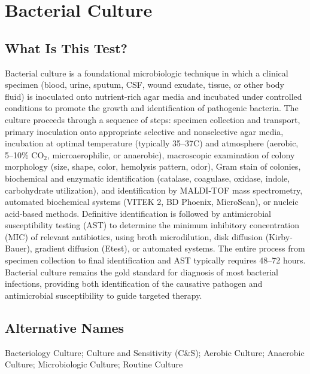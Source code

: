 \chapter{Bacterial Culture}

\section*{What Is This Test?}
Bacterial culture is a foundational microbiologic technique in which a clinical specimen (blood, urine, sputum, CSF, wound exudate, tissue, or other body fluid) is inoculated onto nutrient-rich agar media and incubated under controlled conditions to promote the growth and identification of pathogenic bacteria. The culture proceeds through a sequence of steps: specimen collection and transport, primary inoculation onto appropriate selective and nonselective agar media, incubation at optimal temperature (typically 35--37\textdegree{}C) and atmosphere (aerobic, 5--10\% CO$_2$, microaerophilic, or anaerobic), macroscopic examination of colony morphology (size, shape, color, hemolysis pattern, odor), Gram stain of colonies, biochemical and enzymatic identification (catalase, coagulase, oxidase, indole, carbohydrate utilization), and identification by MALDI-TOF mass spectrometry, automated biochemical systems (VITEK 2, BD Phoenix, MicroScan), or nucleic acid-based methods. Definitive identification is followed by antimicrobial susceptibility testing (AST) to determine the minimum inhibitory concentration (MIC) of relevant antibiotics, using broth microdilution, disk diffusion (Kirby-Bauer), gradient diffusion (Etest), or automated systems. The entire process from specimen collection to final identification and AST typically requires 48--72 hours. Bacterial culture remains the gold standard for diagnosis of most bacterial infections, providing both identification of the causative pathogen and antimicrobial susceptibility to guide targeted therapy.

\section*{Alternative Names}
Bacteriology Culture; Culture and Sensitivity (C\&S); Aerobic Culture; Anaerobic Culture; Microbiologic Culture; Routine Culture

